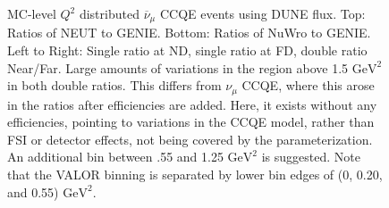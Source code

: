 \documentclass[12pt]{article}
\begin{document}
\begin{figure}[h]
\endminipage
\caption{MC-level $Q^2$ distributed $\overline{\nu}_{\mu}$ CCQE events using DUNE flux. Top: Ratios of NEUT to GENIE. Bottom: Ratios of NuWro to GENIE. Left to Right: Single ratio at ND, single ratio at FD, double ratio Near/Far. Large amounts of variations in the region above 1.5 $\textrm{GeV}^2$ in both double ratios. This differs from $\nu_{\mu}$ CCQE, where this arose in the ratios after efficiencies are added. Here, it exists without any efficiencies, pointing to variations in the CCQE model, rather than FSI or detector effects, not being covered by the parameterization. An additional bin between .55 and 1.25 $\textrm{GeV}^2$ is suggested. Note that the VALOR binning is separated by lower bin edges of (0, 0.20, and 0.55) $\textrm{GeV}^2$.}
\label{fig:Q2_ccqe_bar}
\end{figure}
\FloatBarrier
\end{document}
